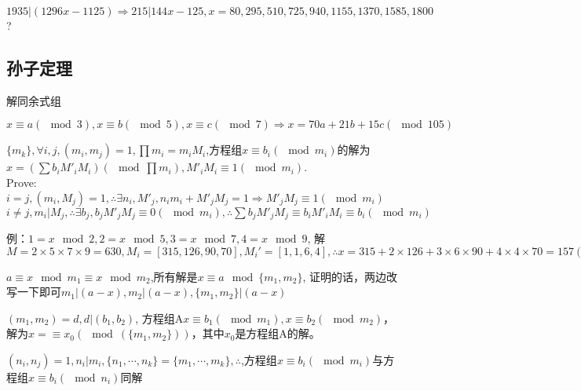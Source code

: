 \documentclass[UTF8]{../09-Mathematics}
\begin{document}
\begin{proposition}
    $1935|(1296x-1125) \Rightarrow 215|144x-125, x = 80,295,510,725,940,1155,1370,1585,1800$?
\end{proposition}

\subsection{孙子定理}
解同余式组
\begin{proposition}
    $x \equiv a(\mod 3), x \equiv b(\mod 5),x \equiv c(\mod 7) \Rightarrow x = 70a + 21b + 15c (\mod 105)$
\end{proposition}


\begin{proposition}
    $\{ m_k\}, \forall i,j, (m_i, m_j) = 1, \prod m_i = m_i M_i$,方程组$x \equiv b_i (\mod m_i)$的解为$x = (\sum b_i M'_i M_i)(\mod \prod m_i),  M'_i M_i \equiv 1(\mod m_i)$.\\
    Prove: $i = j, (m_i, M_j) = 1, \therefore \exists n_i, M'_j,  n_i m_i  + M'_j M_j = 1 \Rightarrow M'_j M_j \equiv 1(\mod m_i)$\\
    $i \neq j, m_i|M_j, \therefore \exists b_j, b_j M'_j M_j \equiv 0 (\mod m_i), \therefore \sum b_j M'_j M_j \equiv b_i M'_i M_i \equiv b_i (\mod m_i) $

    例：$1= x \mod 2, 2= x \mod 5, 3= x \mod 7, 4= x \mod 9$, 
    解$M = 2 \times 5 \times 7 \times 9 = 630, M_i =[315,126,90,70], M_i' =[1,1,6,4], \therefore x = 315 + 2\times 126 + 3 \times 6\times 90 + 4\times 4\times 70 = 157(\mod 630), \therefore x = 157 + 630k, k\in \mathbb Z$
\end{proposition}

\begin{proposition}
    $a \equiv x \mod m_1  \equiv x \mod m_2$,所有解是$x \equiv a \mod \{ m_1, m_2\}$, 证明的话，两边改写一下即可$m_1|(a-x),m_2|(a-x),\{ m_1, m_2\}|(a-x) $
\end{proposition}

\begin{proposition}
    $(m_1, m_2) = d, d|(b_1, b_2)$, 方程组A$x \equiv b_1(\mod m_1  ), x \equiv b_2(\mod m_2  )$，解为$x =\equiv x_0(\mod (\{ m_1, m_2\}))$，其中$x_0$是方程组A的解。
\end{proposition}

\begin{proposition}
    $(n_i, n_j) = 1, n_i | m_i, \{n_1, \cdots, n_k  \}= \{m_1, \cdots, m_k  \}, \therefore $,方程组$x \equiv b_i (\mod m_i)$与方程组$x \equiv b_i (\mod n_i)$同解
\end{proposition}
\end{document}
